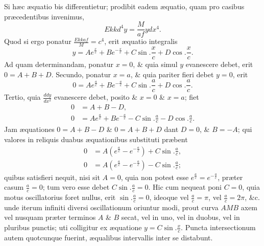 Si hæc æquatio bis differentietur; prodibit eadem æquatio, quam pro casibus præcedentibus invenimus,
\[Ekkd^4y=\frac M{af}ydx^4.\]
Quod si ergo ponatur $\frac{Ekkaf}{M}=c^4$, erit æquatio integralis
\[y=Ae^{\frac xc}+Be^{-\frac xc}+C\sin.\frac xc+D\cos.\frac xc.\]
Ad quam determinandam, ponatur $x=0$, \& quia simul $y$ evanescere debet, erit $0=A+B+D$. Secundo, ponatur $x=a$, \& quia pariter fieri debet $y=0$, erit
\[0=Ae^{\frac ac}+Be^{-\frac ac}+C\sin.\frac ac+D\cos.\frac ac.\]
Tertio, quia $\frac{ddy}{dx^2}$ evanescere debet, posito \& $x=0$ \& $x=a$; fiet
\[\begin{aligned}0&=A+B-D,\\
0&=Ae^{\frac ac}+Be^{-\frac ac}-C\sin.\frac ac-D\cos.\frac ac.\end{aligned}\]
Jam æquationes $0=A+B-D$ \& $0=A+B+D$ dant $D=0$, \& $B=-A$; qui valores in reliquis duabus æquationibus substituti præbent
\[\begin{aligned}0&=A(e^{\frac ac}-e^{-\frac ac})+C\sin.\frac ac,\\0&=A(e^{\frac ac}-e^{-\frac ac})-C\sin.\frac ac;\end{aligned}\]
quibus satisfieri nequit, nisi sit $A=0$, quia non potest esse $e^{\frac ac}=e^{-\frac ac}$, præter casum $\frac ac=0$; tum vero esse debet $C\sin.\frac ac=0$. Hic cum nequeat poni $C=0$, quia motus oscillatorius foret nullus, erit $\sin.\frac ac=0$, ideoque vel
$\frac ac=\pi$, vel $\frac ac=2\pi$, \&c. unde iterum infiniti diversi oscillationum oriuntur modi, prout curva $AMB$ axem vel nusquam præter terminos $A$ \& $B$ secat, vel in uno, vel in duobus, vel in pluribus punctis; uti colligitur ex æquatione $y=C\sin.\frac xc$. Puncta intersectionum autem quotcunque fuerint, æqualibus intervallis inter se distabunt.

